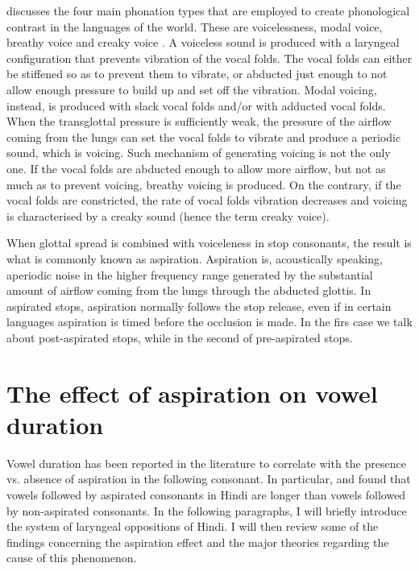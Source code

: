 \documentclass[11pt,a4paper,openany]{memoir}\usepackage[]{graphicx}\usepackage[]{color}
\begin{document}
\citet{ladefoged1973} discusses the four main phonation types that are employed to create phonological contrast in the languages of the world.
These are voicelessness, modal voice, breathy voice and creaky voice \citep{halle2002}.
A voiceless sound is produced with a laryngeal configuration that prevents vibration of the vocal folds.
The vocal folds can either be stiffened so as to prevent them to vibrate, or abducted just enough to not allow enough pressure to build up and set off the vibration.
Modal voicing, instead, is produced with slack vocal folds and/or with adducted vocal folds.
When the transglottal pressure is sufficiently weak, the pressure of the airflow coming from the lungs can set the vocal folds to vibrate and produce a periodic sound, which is voicing.
Such mechanism of generating voicing is not the only one.
If the vocal folds are abducted enough to allow more airflow, but not as much as to prevent voicing, breathy voicing is produced.
On the contrary, if the vocal folds are constricted, the rate of vocal folds vibration decreases and voicing is characterised by a creaky sound (hence the term creaky voice).

When glottal spread is combined with voiceleness in stop consonants, the result is what is commonly known as aspiration.
Aspiration is, acoustically speaking, aperiodic noise in the higher frequency range generated by the substantial amount of airflow coming from the lungs through the abducted glottis.
In aspirated stops, aspiration normally follows the stop release, even if in certain languages aspiration is timed before the occlusion is made.
In the firs case we talk about post-aspirated stops, while in the second of pre-aspirated stops.


\section{The effect of aspiration on vowel duration}
\label{s:aspiration}

Vowel duration has been reported in the literature to correlate with the presence vs. absence of aspiration in the following consonant.
In particular, \citet{maddieson1976} and \citet{durvasula2012} found that vowels followed by aspirated consonants in Hindi are longer than vowels followed by non-aspirated consonants.
In the following paragraphs, I will briefly introduce the system of laryngeal oppositions of Hindi.
I will then review some of the findings concerning the aspiration effect and the major theories regarding the cause of this phenomenon.
\end{document}
